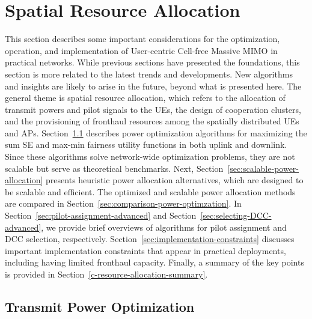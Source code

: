 
\chapter{Spatial Resource Allocation}
\label{c-resource-allocation} 
\vspace{-1cm}
This section describes some important considerations for the optimization, operation, and implementation of User-centric Cell-free Massive MIMO in practical networks. While previous sections have presented the foundations, this section is more related to the latest trends and developments. New algorithms and insights are likely to arise in the future, beyond what is presented here.
The general theme is spatial resource allocation, which refers to the allocation of transmit powers and pilot signals to the UEs, the design of cooperation clusters, and the provisioning of fronthaul resources among the spatially distributed UEs and APs. Section~\ref{sec:optimized-power-allocation} describes power optimization algorithms for maximizing the sum SE and max-min fairness utility functions in both uplink and downlink. Since these algorithms solve network-wide optimization problems, they are not scalable but serve as theoretical benchmarks.
 Next, Section~\ref{sec:scalable-power-allocation} presents heuristic power allocation alternatives, which are designed to be scalable and efficient. The optimized and scalable power allocation methods are compared in Section~\ref{sec:comparison-power-optimzation}.
  In Section~\ref{sec:pilot-assignment-advanced} and Section~\ref{sec:selecting-DCC-advanced}, we provide brief overviews of algorithms for pilot assignment and DCC selection, respectively. Section~\ref{sec:implementation-constraints} discusses important implementation constraints that appear in practical deployments, including having limited fronthaul capacity. Finally, a summary of the key points is provided in Section~\ref{c-resource-allocation-summary}.


\section{Transmit Power Optimization}
\label{sec:optimized-power-allocation}

